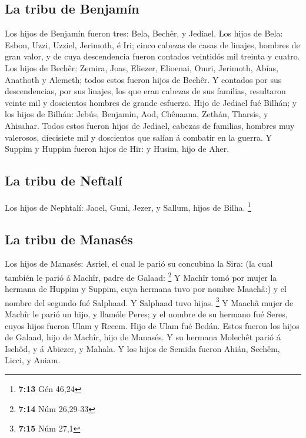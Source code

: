 \hypertarget{la-tribu-de-benjamuxedn}{%
\subsection{La tribu de Benjamín}\label{la-tribu-de-benjamuxedn}}

 Los hijos de Benjamín fueron tres: Bela, Bechêr, y Jediael.
 Los hijos de Bela: Esbon, Uzzi, Uzziel, Jerimoth, é Iri;
cinco cabezas de casas de linajes, hombres de gran valor, y de cuya
descendencia fueron contados veintidós mil treinta y cuatro.
 Los hijos de Bechêr: Zemira, Joas, Eliezer, Elioenai, Omri,
Jerimoth, Abías, Anathoth y Alemeth; todos estos fueron hijos de Bechêr.
 Y contados por sus descendencias, por sus linajes, los que
eran cabezas de sus familias, resultaron veinte mil y doscientos hombres
de grande esfuerzo.  Hijo de Jediael fué Bilhán; y los
hijos de Bilhán: Jebús, Benjamín, Aod, Chênaana, Zethán, Tharsis, y
Ahisahar.  Todos estos fueron hijos de Jediael, cabezas de
familias, hombres muy valerosos, diecisiete mil y doscientos que salían
á combatir en la guerra.  Y Suppim y Huppim fueron hijos de
Hir: y Husim, hijo de Aher.

\hypertarget{la-tribu-de-neftaluxed}{%
\subsection{La tribu de Neftalí}\label{la-tribu-de-neftaluxed}}

 Los hijos de Nephtalí: Jaoel, Guni, Jezer, y Sallum, hijos
de Bilha. \footnote{\textbf{7:13} Gén 46,24}

\hypertarget{la-tribu-de-manasuxe9s}{%
\subsection{La tribu de Manasés}\label{la-tribu-de-manasuxe9s}}

 Los hijos de Manasés: Asriel, el cual le parió su
concubina la Sira: (la cual también le parió á Machîr, padre de Galaad:
\footnote{\textbf{7:14} Núm 26,29-33}  Y Machîr tomó por
mujer la hermana de Huppim y Suppim, cuya hermana tuvo por nombre
Maachâ:) y el nombre del segundo fué Salphaad. Y Salphaad tuvo hijas.
\footnote{\textbf{7:15} Núm 27,1}  Y Maachâ mujer de Machîr
le parió un hijo, y llamóle Peres; y el nombre de su hermano fué Seres,
cuyos hijos fueron Ulam y Recem.  Hijo de Ulam fué Bedán.
Estos fueron los hijos de Galaad, hijo de Machîr, hijo de Manasés.
 Y su hermana Molechêt parió á Ischôd, y á Abiezer, y
Mahala.  Y los hijos de Semida fueron Ahián, Sechêm, Licci,
y Aniam.

